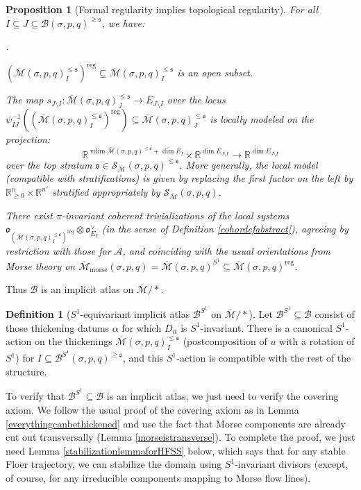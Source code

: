 \documentclass[12pt]{article}
\newtheorem{proposition}[theorem]{Proposition}
\theoremstyle{definition}
\newtheorem{definition}[theorem]{Definition}
\theoremstyle{remark}
\numberwithin{equation}{subsection}
\newcommand{\s}{\mathfrak s}
\newcommand{\oo}{\mathfrak o}
\newcommand{\RR}{\mathbb R}
\newcommand{\SSS}{\mathcal S}
\newcommand{\A}{\mathcal A}
\newcommand{\B}{\mathcal B}
\newcommand{\Mbar}{\overline{\mathcal M}}
\newcommand{\vdim}{\operatorname{vdim}}
\newcommand{\morse}{\mathrm{morse}}
\newcommand{\reg}{\mathrm{reg}}
\newcounter{rcounti}
\newenvironment{rlist}{\begin{list}{\roman{rcounti}.}{\usecounter{rcounti}
\setlength\itemsep{0pt}
\setlength\labelsep{4pt}
\setlength\labelwidth{16pt}
\setlength\leftmargin{32pt}
\setlength\listparindent{0pt}
\setlength\parsep{0pt}
\setlength\parskip{0pt}
\setlength\partopsep{0pt}
\setlength\rightmargin{0pt}
\setlength\topsep{0pt}
\setlength\itemindent{0pt}
}}{\end{list}}
\begin{document}
\begin{proposition}[Formal regularity implies topological regularity]\label{HFgluingSS}
For all $I\subseteq J\subseteq\B(\sigma,p,q)^{\geq\s}$, we have:
\begin{rlist}
\item$(\Mbar(\sigma,p,q)^{\leq\s}_I)^\reg\subseteq\Mbar(\sigma,p,q)^{\leq\s}_I$ is an open subset.
\item The map $s_{J\setminus I}:\Mbar(\sigma,p,q)^{\leq\s}_J\to E_{J\setminus I}$ over the locus $\psi_{IJ}^{-1}((\Mbar(\sigma,p,q)_I^{\leq\s})^\reg)\subseteq\Mbar(\sigma,p,q)^{\leq\s}_J$ is locally modeled on the projection:
\begin{equation}
\RR^{\vdim\Mbar(\sigma,p,q)^{\leq\s}+\dim E_I}\times\RR^{\dim E_{J\setminus I}}\to\RR^{\dim E_{J\setminus I}}
\end{equation}
over the top stratum $\s\in\SSS_{\Mbar}(\sigma,p,q)^{\leq\s}$.  More generally, the local model (compatible with stratifications) is given by replacing the first factor on the left by $\RR_{\geq 0}^n\times\RR^{n'}$ stratified appropriately by $\SSS_{\Mbar}(\sigma,p,q)$.
\item There exist $\pi$-invariant coherent trivializations of the local systems $\oo_{(\Mbar(\sigma,p,q)^{\leq\s}_I)^\reg}\otimes\oo_{E_I}^\vee$ (in the sense of Definition \ref{cohordefabstract}), agreeing by restriction with those for $\A$, and coinciding with the usual orientations from Morse theory on $\Mbar_\morse(\sigma,p,q)=\Mbar(\sigma,p,q)^{S^1}\subseteq\Mbar(\sigma,p,q)^\reg$.
\end{rlist}
\end{proposition}

Thus $\B$ is an implicit atlas on $\Mbar/\ast$.

\begin{definition}[$S^1$-equivariant implicit atlas $\B^{S^1}$ on $\Mbar/\ast$]
Let $\B^{S^1}\subseteq\B$ consist of those thickening datums $\alpha$ for which $D_\alpha$ is $S^1$-invariant.  There is a canonical $S^1$-action on the thickenings $\Mbar(\sigma,p,q)^{\leq\s}_I$ (postcomposition of $u$ with a rotation of $S^1$) for $I\subseteq\B^{S^1}(\sigma,p,q)^{\geq\s}$, and this $S^1$-action is compatible with the rest of the structure.
\end{definition}

To verify that $\B^{S^1}\subseteq\B$ is an implicit atlas, we just need to verify the covering axiom.  We follow the usual proof of the covering axiom as in Lemma \ref{everythingcanbethickened} and use the fact that Morse components are already cut out transversally (Lemma \ref{morseistransverse}).  To complete the proof, we just need Lemma \ref{stabilizationlemmaforHFSS} below, which says that for any stable Floer trajectory, we can stabilize the domain using $S^1$-invariant divisors (except, of course, for any irreducible components mapping to Morse flow lines).
\end{document}
